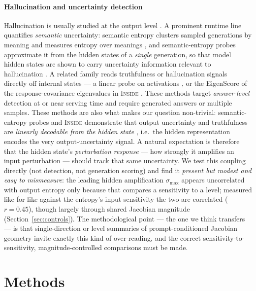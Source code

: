 \documentclass{article}
\begin{document}
\paragraph{Hallucination and uncertainty detection}
Hallucination is usually studied at the output level \cite{ji2023survey,lin2022truthfulqa}. A
prominent runtime line quantifies \emph{semantic} uncertainty: semantic entropy clusters
sampled generations by meaning and measures entropy over meanings
\cite{kuhn2023semantic,farquhar2024detecting}, and semantic-entropy probes approximate it from
the hidden states of a \emph{single} generation, so that model hidden states are shown to carry
uncertainty information relevant to hallucination \cite{kossen2024semantic}. A related family
reads truthfulness or hallucination signals directly off internal states --- a linear probe on
activations \cite{azaria2023internal}, or the EigenScore of the response-covariance eigenvalues
in \textsc{Inside} \cite{chen2024inside}. These methods target \emph{answer-level} detection at
or near serving time and require generated answers or multiple samples. These methods are also what
makes our question non-trivial: semantic-entropy probes and \textsc{Inside} demonstrate that output
uncertainty and truthfulness are \emph{linearly decodable from the hidden state}
\cite{kossen2024semantic,chen2024inside,azaria2023internal}, i.e.\ the hidden representation encodes
the very output-uncertainty signal. A natural expectation is therefore that the hidden state's
\emph{perturbation response} --- how strongly it amplifies an input perturbation --- should track
that same uncertainty. We test this coupling directly (not detection, not generation scoring) and
find it \emph{present but modest and easy to mismeasure}: the leading hidden amplification
$\sigma_{\max}$ appears uncorrelated with output entropy only because that compares a sensitivity to
a level; measured like-for-like against the entropy's input sensitivity the two are correlated
($r=0.45$), though largely through shared Jacobian magnitude (Section~\ref{sec:controls}). The
methodological point --- the one we think transfers --- is that single-direction or level summaries
of prompt-conditioned Jacobian geometry invite exactly this kind of over-reading, and the correct
sensitivity-to-sensitivity, magnitude-controlled comparisons must be made.

\section{Methods}
\label{sec:methods}
\end{document}
